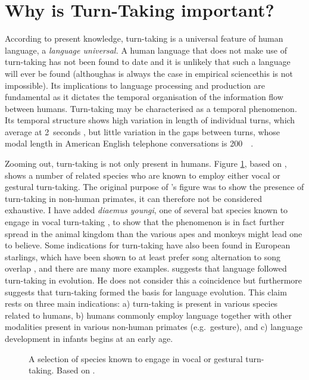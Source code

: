 \section{Why is Turn-Taking important?}
\label{sec:intrott}
According to present knowledge, turn-taking is a universal feature of human language, a \emph{language universal.}
A human language that does not make use of turn-taking has not been found to date and it is unlikely that such a language will ever be found (although\dash as is always the case in empirical science\dash this is not impossible).
Its implications to language processing and production are fundamental as it dictates the temporal organisation of the information flow between humans.
Turn-taking may be characterised as a temporal phenomenon.
Its temporal structure shows high variation in length of individual turns, which average at 2~seconds \citep[]{levinson_turn-taking_2016}, but little variation in the gaps between turns, whose modal length in American English telephone conversations is 200~\ms\ \citep[]{levinson_timing_2015}.

Zooming out, turn-taking is not only present in humans.
Figure \ref{fig:species}, based on \citet[]{levinson_turn-taking_2016}, shows a number of related species who are known to employ either vocal or gestural turn-taking.
The original purpose of \citeauthor{levinson_turn-taking_2016}'s figure was to show the presence of turn-taking in non-human primates, it can therefore not be considered exhaustive.
I have added \emph{diaemus youngi}, one of several bat species known to engage in vocal turn-taking \citep[]{vernes_what_2017}, to show that the phenomenon is in fact further spread in the animal kingdom than the various apes and monkeys might lead one to believe.
Some indications for turn-taking have also been found in European starlings, which have been shown to at least prefer song alternation to song overlap \citep{henry_social_2015}, and there are many more examples.
\citet[]{levinson_turn-taking_2016} suggests that language followed turn-taking in evolution. He does not consider this a coincidence but furthermore suggests that turn-taking formed the basis for language evolution.
This claim rests on three main indications: a) turn-taking is present in various species related to humans, b) humans commonly employ language together with other modalities present in various non-human primates (e.g.~gesture), and c) language development in infants begins at an early age.

\begin{figure}
	\centering
	
	\label{fig:species}
	\caption[Species known to engage in vocal or gestural turn-taking.]{A selection of species known to engage in vocal or gestural turn-taking. Based on \citet[]{levinson_turn-taking_2016}.}
\end{figure}

